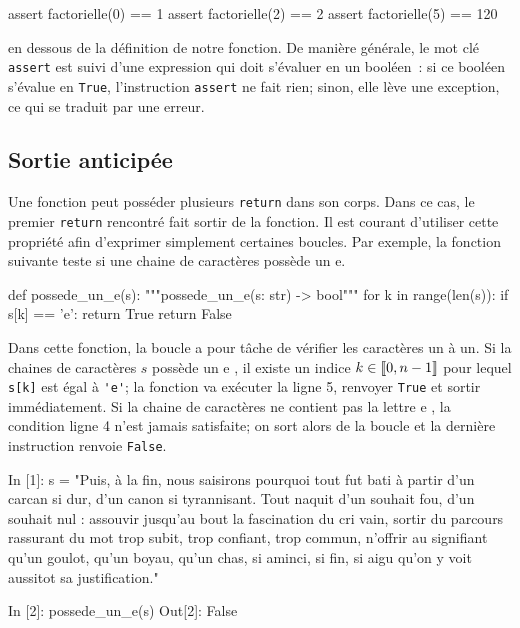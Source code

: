 \documentclass{magnoliaold}
\begin{document}
\begin{pythoncodeline}
assert factorielle(0) == 1
assert factorielle(2) == 2
assert factorielle(5) == 120
\end{pythoncodeline}
en dessous de la définition de notre fonction. De manière générale, le mot clé \verb!assert! est suivi d'une
expression qui doit s'évaluer en un booléen~: si ce booléen s'évalue en \verb!True!, l'instruction
\verb!assert! ne fait rien; sinon, elle lève une exception, ce qui se traduit par une erreur.

\subsection{Sortie anticipée}

Une fonction peut posséder plusieurs \verb_return_ dans son corps. Dans ce cas, le
premier \verb_return_ rencontré fait sortir de la fonction. Il est courant d'utiliser
cette propriété afin d'exprimer simplement certaines boucles. Par exemple, la fonction
suivante teste si une chaine de caractères possède un e.

\begin{pythoncodeline}
def possede_un_e(s):
    """possede_un_e(s: str) -> bool"""
    for k in range(len(s)):
        if s[k] == 'e':
            return True
    return False
\end{pythoncodeline}

\noindent
Dans cette fonction, la boucle a pour tâche de vérifier les caractères un à un. Si la
chaines de caractères $s$ possède un \og e \fg, il existe un indice $k\in\left\llbracket 0,n-1\right\rrbracket$
pour lequel \verb_s[k]_ est égal à \verb_'e'_; la fonction va exécuter la ligne 5,
renvoyer \verb_True_ et sortir immédiatement. Si la chaine de caractères
ne contient pas la lettre \og e \fg, la condition ligne 4 n'est jamais
satisfaite; on sort alors de la boucle et la dernière instruction renvoie \verb_False_.

\begin{pythoncode}
In [1]: s = "Puis, à la fin, nous saisirons pourquoi tout fut bati à partir d'un carcan si dur, d'un canon si tyrannisant. Tout naquit d'un souhait fou, d'un souhait nul : assouvir jusqu'au bout la fascination du cri vain, sortir du parcours rassurant du mot trop subit, trop confiant, trop commun, n'offrir au signifiant qu'un goulot, qu'un boyau, qu'un chas, si aminci, si fin, si aigu qu'on y voit aussitot sa justification."

In [2]: possede_un_e(s)
Out[2]: False
\end{pythoncode}
\end{document}
